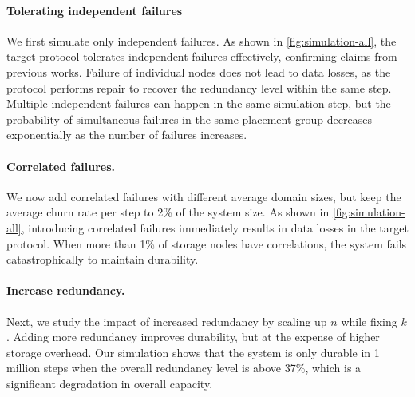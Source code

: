 \paragraph{Tolerating independent failures}
We first simulate only independent failures.
As shown in \autoref{fig:simulation-all}, the target protocol tolerates independent failures effectively, confirming claims from previous works.
Failure of individual nodes does not lead to data losses, as the protocol performs repair to recover the redundancy level within the same step.
Multiple independent failures can happen in the same simulation step, but the probability of simultaneous failures in the same placement group decreases exponentially as the number of failures increases.


\paragraph{Correlated failures.}
We now add correlated failures with different average domain sizes, but keep the average churn rate per step to 2\% of the system size.
As shown in \autoref{fig:simulation-all}, introducing correlated failures immediately results in data losses in the target protocol.
When more than 1\% of storage nodes have correlations, the system fails catastrophically to maintain durability.


\paragraph{Increase redundancy.}
Next, we study the impact of increased redundancy by scaling up $n$ while fixing $k$.
Adding more redundancy improves durability, but at the expense of higher storage overhead.
Our simulation shows that the system is only durable in 1 million steps when the overall redundancy level is above 37\%, which is a significant degradation in overall capacity.


